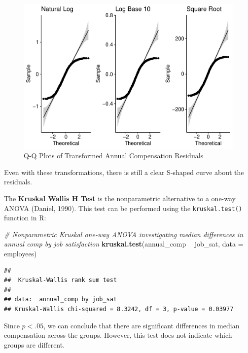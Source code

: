 \documentclass[]{book}
\newenvironment{Shaded}{\begin{snugshade}}{\end{snugshade}}
\newcommand{\CommentTok}[1]{\textcolor[rgb]{0.56,0.35,0.01}{\textit{#1}}}
\newcommand{\DataTypeTok}[1]{\textcolor[rgb]{0.13,0.29,0.53}{#1}}
\newcommand{\KeywordTok}[1]{\textcolor[rgb]{0.13,0.29,0.53}{\textbf{#1}}}
\newcommand{\NormalTok}[1]{#1}
\newcommand{\OperatorTok}[1]{\textcolor[rgb]{0.81,0.36,0.00}{\textbf{#1}}}
\newcommand{\StringTok}[1]{\textcolor[rgb]{0.31,0.60,0.02}{#1}}
\begin{document}
\begin{figure}

{\centering \includegraphics{People_Analytics_Lifecycle_files/figure-latex/qq-plots-trans-1} 

}

\caption{Q-Q Plots of Transformed Annual Compensation Residuals}\label{fig:qq-plots-trans}
\end{figure}

Even with these transformations, there is still a clear S-shaped curve about the residuals.

The \textbf{Kruskal Wallis H Test} is the nonparametric alternative to a one-way ANOVA (Daniel, 1990). This test can be performed using the \texttt{kruskal.test()} function in R:

\begin{Shaded}
\begin{Highlighting}[]
\CommentTok{# Nonparametric Kruskal one-way ANOVA investigating median differences in annual comp by job satisfaction}
\KeywordTok{kruskal.test}\NormalTok{(annual_comp }\OperatorTok{~}\StringTok{ }\NormalTok{job_sat, }\DataTypeTok{data =}\NormalTok{ employees)}
\end{Highlighting}
\end{Shaded}

\begin{verbatim}
## 
##  Kruskal-Wallis rank sum test
## 
## data:  annual_comp by job_sat
## Kruskal-Wallis chi-squared = 8.3242, df = 3, p-value = 0.03977
\end{verbatim}

Since \(p < .05\), we can conclude that there are significant differences in median compensation across the groups. However, this test does not indicate which groups are different.
\end{document}
